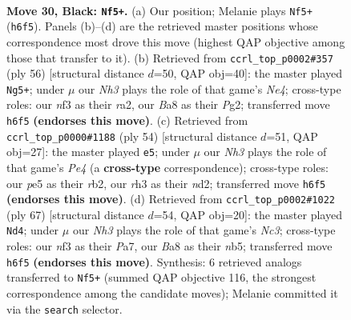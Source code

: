 \documentclass[11pt]{article}
\begin{document}
\clearpage

\begin{figure}[p]\centering
\begin{subfigure}{0.46\textwidth}\centering
\resizebox{\linewidth}{!}{%
\newchessgame
\chessboard[
  setfen={b3k2r/P4p2/R5pn/4P3/8/5NKR/4r1P1/3N4 b k - 6 30},
  showmover=false,
  pgfstyle=straightmove, color=movearrow, markmove={h6-f5}
]}
\caption{}
\end{subfigure}\hfill
\begin{subfigure}{0.46\textwidth}\centering
\resizebox{\linewidth}{!}{%
\newchessgame
\chessboard[
  setfen={1n2r3/5k1p/3P2p1/8/4NP2/p3R3/r5PP/6K1 w - - 0 29},
  showmover=false,
  pgfstyle=straightmove, color=movearrow, markmove={e4-g5}
]}
\caption{}
\end{subfigure}
\\[4pt]
\begin{subfigure}{0.46\textwidth}\centering
\resizebox{\linewidth}{!}{%
\newchessgame
\chessboard[
  setfen={4r1k1/2R2pp1/p1N5/7p/P3P3/7P/1r1n2P1/4R1K1 w - - 0 28},
  showmover=false,
  pgfstyle=straightmove, color=movearrow, markmove={e4-e5}
]}
\caption{}
\end{subfigure}\hfill
\begin{subfigure}{0.46\textwidth}\centering
\resizebox{\linewidth}{!}{%
\newchessgame
\chessboard[
  setfen={2R5/p3k1rp/1pn5/1Np5/2P5/1P5P/3r2P1/6RK b - - 9 34},
  showmover=false,
  pgfstyle=straightmove, color=movearrow, markmove={c6-d4}
]}
\caption{}
\end{subfigure}
\caption{\textbf{Move 30, Black: \texttt{Nf5+}.} (a) Our position; Melanie plays \texttt{Nf5+} (\texttt{h6f5}). Panels (b)--(d) are the retrieved master positions whose correspondence most drove this move (highest QAP objective among those that transfer to it). (b) Retrieved from \texttt{ccrl\_top\_p0002\#357} (ply 56) [structural distance $d$=50, QAP obj=40]: the master played \texttt{Ng5+}; under $\mu$ our \emph{Nh3} plays the role of that game's \emph{Ne4}; cross-type roles: our \emph{n}f3 as their \emph{r}a2, our \emph{B}a8 as their \emph{P}g2; transferred move \texttt{h6f5} \textbf{(endorses this move)}. (c) Retrieved from \texttt{ccrl\_top\_p0000\#1188} (ply 54) [structural distance $d$=51, QAP obj=27]: the master played \texttt{e5}; under $\mu$ our \emph{Nh3} plays the role of that game's \emph{Pe4} (a \textbf{cross-type} correspondence); cross-type roles: our \emph{p}e5 as their \emph{r}b2, our \emph{r}h3 as their \emph{n}d2; transferred move \texttt{h6f5} \textbf{(endorses this move)}. (d) Retrieved from \texttt{ccrl\_top\_p0002\#1022} (ply 67) [structural distance $d$=54, QAP obj=20]: the master played \texttt{Nd4}; under $\mu$ our \emph{Nh3} plays the role of that game's \emph{Nc3}; cross-type roles: our \emph{n}f3 as their \emph{P}a7, our \emph{B}a8 as their \emph{n}b5; transferred move \texttt{h6f5} \textbf{(endorses this move)}. Synthesis: 6 retrieved analogs transferred to \texttt{Nf5+} (summed QAP objective 116, the strongest correspondence among the candidate moves); Melanie committed it via the \texttt{search} selector.}
\label{fig:thought-m59}
\end{figure}
\end{document}

